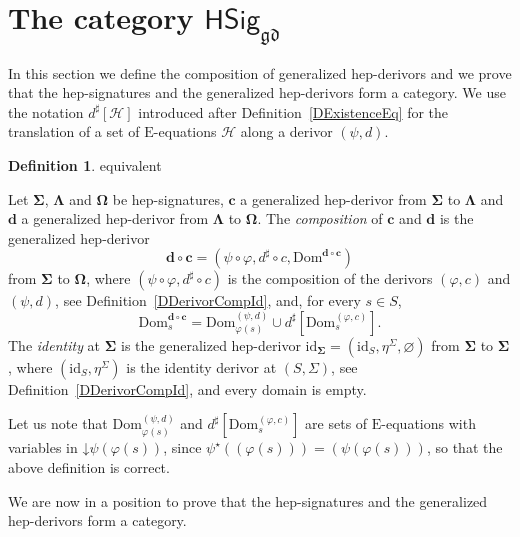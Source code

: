 \documentclass[a4paper, reqno]{amsbook}
\makeatletter
\newcommand{\vs}[1]{\mathbin{\downarrow}#1}
\newcommand{\sig}[1]{\mathbf{#1}}             %
\newcommand{\Dom}{\mathrm{Dom}}
\newcommand{\gd}{\mathfrak{gd}}              %
\newcommand{\id}{\mathrm{id}}
\theoremstyle{plain}
\theoremstyle{definition}
\newtheorem{definition}[theorem]{Definition}
\newcommand*{\CA@leanpending}{}
\newcommand*{\CA@leanrelation}{}
\newcommand*{\lean}[2]{%
  \ifcsname\string\color@lean@#1\endcsname\else
    \PackageError{main}{Unknown relation `#1' in \string\lean}{Use equivalent, weaker or stronger.}%
  \fi
  \gdef\CA@leanrelation{#1}%
  \gdef\CA@leanpending{#2}}
\makeatother
\begin{document}
\section{The category \texorpdfstring{$\mathsf{HSig}_{\gd}$}{HSiggd}}\label{SHepSigCat}

In this section we define the composition of generalized hep-derivors and we prove that the hep-signatures and the generalized hep-derivors form a category.
We use the notation $d^{\sharp}[\mathcal{H}]$ introduced after Definition~\ref{DExistenceEq} for the translation of a set of $\mathrm{E}$-equations $\mathcal{H}$ along a derivor $(\psi,d)$.

\begin{definition}\label{DGenHepDerivorCompId}\lean{equivalent}{GeneralizedHepDerivor.comp,GeneralizedHepDerivor.identity}
Let $\sig{\Sigma}$, $\sig{\Lambda}$ and $\sig{\Omega}$ be hep-signatures, $\mathbf{c}$ a generalized hep-derivor from $\sig{\Sigma}$ to $\sig{\Lambda}$ and $\mathbf{d}$ a generalized hep-derivor from $\sig{\Lambda}$ to $\sig{\Omega}$.
The \emph{composition} of $\mathbf{c}$ and $\mathbf{d}$ is the generalized hep-derivor
$$
\mathbf{d}\circ\mathbf{c}=\left(\psi\circ\varphi,d^{\sharp}\circ c,\Dom^{\mathbf{d}\circ\mathbf{c}}\right)
$$
from $\sig{\Sigma}$ to $\sig{\Omega}$, where $(\psi\circ\varphi,d^{\sharp}\circ c)$ is the composition of the derivors $(\varphi,c)$ and $(\psi,d)$, see Definition~\ref{DDerivorCompId}, and, for every $s\in S$,
$$
\Dom^{\mathbf{d}\circ\mathbf{c}}_{s}=\Dom^{(\psi,d)}_{\varphi(s)}\cup d^{\sharp}\left[\Dom^{(\varphi,c)}_{s}\right].
$$
The \emph{identity} at $\sig{\Sigma}$ is the generalized hep-derivor $\id_{\sig{\Sigma}}=(\id_{S},\eta^{\Sigma},\varnothing)$ from $\sig{\Sigma}$ to $\sig{\Sigma}$, where $(\id_{S},\eta^{\Sigma})$ is the identity derivor at $(S,\Sigma)$, see Definition~\ref{DDerivorCompId}, and every domain is empty.
\end{definition}

Let us note that $\Dom^{(\psi,d)}_{\varphi(s)}$ and $d^{\sharp}[\Dom^{(\varphi,c)}_{s}]$ are sets of $\mathrm{E}$-equations with variables in $\vs{\psi(\varphi(s))}$, since $\psi^{\star}((\varphi(s)))=(\psi(\varphi(s)))$, so that the above definition is correct.

We are now in a position to prove that the hep-signatures and the generalized hep-derivors form a category.
\end{document}
